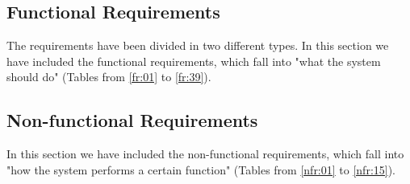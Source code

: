 	\subsection{Functional Requirements}
	The requirements have been divided in two different types. In this section we have included the functional requirements, which fall into "what the system should do" (Tables from \ref{fr:01} to \ref{fr:39}).

	\subsection{Non-functional Requirements}
	In this section we have included the non-functional requirements, which fall into "how the system performs a certain function" (Tables from \ref{nfr:01} to \ref{nfr:15}).

	\newpage
	
                                                                                  
